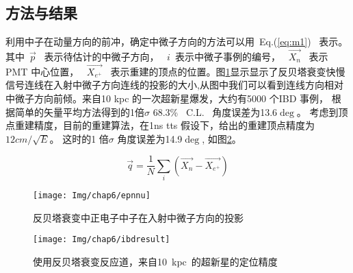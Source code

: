 \subsection{方法与结果}
利用中子在动量方向的前冲，确定中微子方向的方法可以用~Eq.(\ref{eq:m1})~ 表示。其中~$\vec{p}$~ 表示待估计的中微子方向， ~$i$~表示中微子事例的编号， ~$\vec{X_{n}}$~ 表示PMT 中心位置， ~$\vec{X_{e^+}}$~ 表示重建的顶点的位置。图\ref{fig:epnnu}显示显示了反贝塔衰变快慢信号连线在入射中微子方向连线的投影的大小,从图中我们可以看到连线方向相对中微子方向前倾。来自10 kpc 的一次超新星爆发，大约有5000 个IBD 事例， 根据简单的矢量平均方法得到的1倍$\sigma$ 68.3\% ~C.L.~ 角度误差为13.6$\deg$。 考虑到顶点重建精度，目前的重建算法，在1ns tts 假设下，给出的重建顶点精度为$12cm/\sqrt{E}$。 这时的1 倍$\sigma$ 角度误差为14.9$\deg$, 如图\ref{fig:ibdf}。

\begin{equation}\label{eq:m1}
\vec{q} = \frac{1}{N}\sum_{i}(\vec{X_{n}}-\vec{X_{e^+}})
\end{equation}
\begin{figure}[!htbp]
  \centering
   \texttt{[image: Img/chap6/epnnu]}
    \caption{反贝塔衰变中正电子中子在入射中微子方向的投影}
  \label{fig:epnnu}
\end{figure}
\begin{figure}[!htbp]
  \centering
   \texttt{[image: Img/chap6/ibdresult]}
    \caption{使用反贝塔衰变反应道，来自10~kpc~的超新星的定位精度}
  \label{fig:ibdf}
\end{figure}

